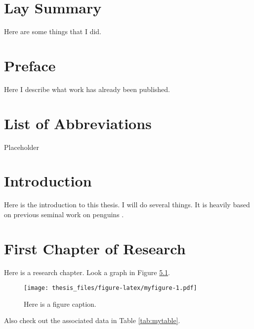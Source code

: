 \documentclass[
  oneside]{ubcthesis}
\begin{document}
\chapter{Lay Summary}

Here are some things that I did.

\chapter{Preface}

Here I describe what work has already been published.

{
\setcounter{tocdepth}{2}
\tableofcontents
}
\hypertarget{list-of-abbreviations}{%
\chapter{List of Abbreviations}\label{list-of-abbreviations}}

Placeholder

\hypertarget{introduction}{%
\chapter{Introduction}\label{introduction}}

Here is the introduction to this thesis. I will do several things. It is heavily based on previous seminal work on penguins \citep{meyer2003pressures}.

\hypertarget{first-chapter-of-research}{%
\chapter{First Chapter of Research}\label{first-chapter-of-research}}

Here is a research chapter. Look a graph in Figure \ref{fig:myfigure}.

\begin{figure}
\centering
\texttt{[image: thesis\_files/figure-latex/myfigure-1.pdf]}
\caption{\label{fig:myfigure}Here is a figure caption.}
\end{figure}



Also check out the associated data in Table \ref{tab:mytable}.
\end{document}
